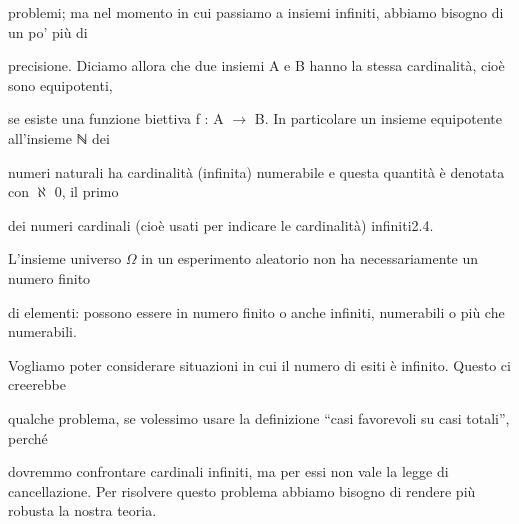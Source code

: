 \documentclass[a4paper,portrait,12pt]{article}
\begin{document}
\begin{flushleft}
problemi; ma nel momento in cui passiamo a insiemi infiniti, abbiamo bisogno di un po' più di
\end{flushleft}


\begin{flushleft}
precisione. Diciamo allora che due insiemi A e B hanno la stessa cardinalit\`{a}, cio\`{e} sono equipotenti,
\end{flushleft}


\begin{flushleft}
se esiste una funzione biettiva f : A $\rightarrow$ B. In particolare un insieme equipotente all'insieme ℕ dei
\end{flushleft}


\begin{flushleft}
numeri naturali ha cardinalit\`{a} (infinita) numerabile e questa quantit\`{a} \`{e} denotata con $\aleph$ 0, il primo
\end{flushleft}


\begin{flushleft}
dei numeri cardinali (cio\`{e} usati per indicare le cardinalit\`{a}) infiniti2.4.
\end{flushleft}


\begin{flushleft}
L'insieme universo $\Omega$ in un esperimento aleatorio non ha necessariamente un numero finito
\end{flushleft}


\begin{flushleft}
di elementi: possono essere in numero finito o anche infiniti, numerabili o più che numerabili.
\end{flushleft}


\begin{flushleft}
Vogliamo poter considerare situazioni in cui il numero di esiti \`{e} infinito. Questo ci creerebbe
\end{flushleft}


\begin{flushleft}
qualche problema, se volessimo usare la definizione {``}casi favorevoli su casi totali'', perch\'{e}
\end{flushleft}


\begin{flushleft}
dovremmo confrontare cardinali infiniti, ma per essi non vale la legge di cancellazione. Per risolvere questo problema abbiamo bisogno di rendere più robusta la nostra teoria.
\end{flushleft}
\end{document}
